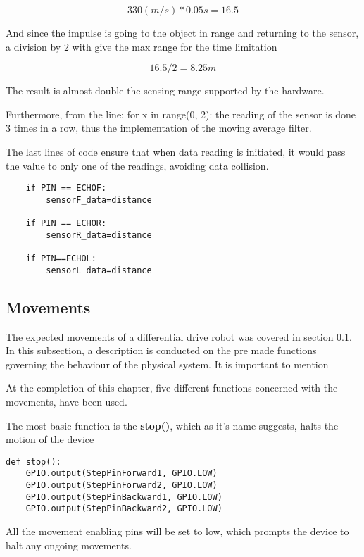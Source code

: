 \begin{equation}
330(m/s)*0.05s=16.5
\end{equation}

And since the impulse is going to the object in range and returning to the sensor, a division by 2 with give the max range for the time limitation 

\begin{equation}
16.5/2=8.25m
\end{equation}

The result is almost double the sensing range supported by the hardware. 

Furthermore, from the line: for x in range(0, 2): the reading of the sensor is done 3 times in a row, thus the implementation of the moving average filter.

The last lines of code ensure that when data reading is initiated, it would pass the value to only one of the readings, avoiding data collision.

\begin{lstlisting}
	if PIN == ECHOF:
		sensorF_data=distance

	if PIN == ECHOR:
		sensorR_data=distance

	if PIN==ECHOL:
		sensorL_data=distance

\end{lstlisting}

\subsection{Movements}

The expected movements of a differential drive robot was covered in section \ref{}. In this subsection, a description is conducted on the pre made functions governing the behaviour of the physical system. It is important to mention  
  
At the completion of this chapter, five different functions concerned with the movements, have been used.

The most basic function is the \textbf{stop()}, which as it's name suggests, halts the motion of the device

\begin{lstlisting}
def stop():
	GPIO.output(StepPinForward1, GPIO.LOW)
	GPIO.output(StepPinForward2, GPIO.LOW)
	GPIO.output(StepPinBackward1, GPIO.LOW)
	GPIO.output(StepPinBackward2, GPIO.LOW)
\end{lstlisting}

All the movement enabling pins will be set to low, which prompts the device to halt any ongoing movements. 

